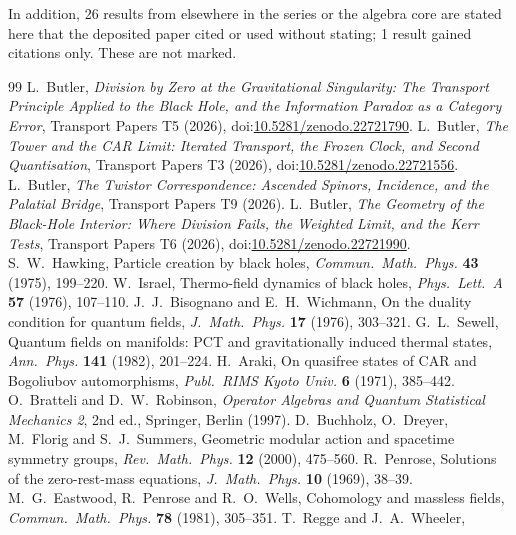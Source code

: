 \documentclass[11pt]{article}
\theoremstyle{definition}
\theoremstyle{plain}
\begin{document}
\noindent In addition, 26 results from elsewhere in the series or the algebra core are stated here that the deposited paper cited or used without stating; 1 result gained citations only. These are not marked.
\begin{thebibliography}{99}
 L.~Butler,
\emph{Division by Zero at the Gravitational Singularity: The Transport Principle Applied to the Black Hole, and the Information Paradox as a Category Error},
Transport Papers T5 (2026), doi:\href{https://doi.org/10.5281/zenodo.22721790}{10.5281/zenodo.22721790}.
 L.~Butler,
\emph{The Tower and the CAR Limit: Iterated Transport, the Frozen Clock, and Second Quantisation},
Transport Papers T3 (2026), doi:\href{https://doi.org/10.5281/zenodo.22721556}{10.5281/zenodo.22721556}.
 L.~Butler,
\emph{The Twistor Correspondence: Ascended Spinors, Incidence, and the Palatial Bridge},
Transport Papers T9 (2026).
 L.~Butler,
\emph{The Geometry of the Black-Hole Interior: Where Division Fails, the Weighted Limit, and the Kerr Tests},
Transport Papers T6 (2026), doi:\href{https://doi.org/10.5281/zenodo.22721990}{10.5281/zenodo.22721990}.
 S.~W.~Hawking,
Particle creation by black holes,
\emph{Commun.\ Math.\ Phys.} \textbf{43} (1975), 199--220.
 W.~Israel,
Thermo-field dynamics of black holes,
\emph{Phys.\ Lett.\ A} \textbf{57} (1976), 107--110.
 J.~J.~Bisognano and E.~H.~Wichmann,
On the duality condition for quantum fields,
\emph{J.\ Math.\ Phys.} \textbf{17} (1976), 303--321.
 G.~L.~Sewell,
Quantum fields on manifolds: PCT and gravitationally induced thermal states,
\emph{Ann.\ Phys.} \textbf{141} (1982), 201--224.
 H.~Araki,
On quasifree states of CAR and Bogoliubov automorphisms,
\emph{Publ.\ RIMS Kyoto Univ.} \textbf{6} (1971), 385--442.
 O.~Bratteli and D.~W.~Robinson,
\emph{Operator Algebras and Quantum Statistical Mechanics 2}, 2nd ed.,
Springer, Berlin (1997).
 D.~Buchholz, O.~Dreyer, M.~Florig and S.~J.~Summers,
Geometric modular action and spacetime symmetry groups,
\emph{Rev.\ Math.\ Phys.} \textbf{12} (2000), 475--560.
 R.~Penrose,
Solutions of the zero-rest-mass equations,
\emph{J.\ Math.\ Phys.} \textbf{10} (1969), 38--39.
 M.~G.~Eastwood, R.~Penrose and R.~O.~Wells,
Cohomology and massless fields,
\emph{Commun.\ Math.\ Phys.} \textbf{78} (1981), 305--351.
 T.~Regge and J.~A.~Wheeler,

\end{thebibliography}
\end{document}
